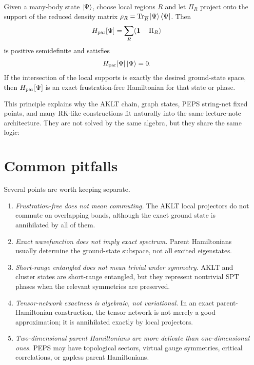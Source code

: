 \begin{principle}
Given a many-body state \(\left|\Psi\right\rangle\), choose local regions \(R\) and let
\(\Pi_R\) project onto the support of the reduced density matrix
\(\rho_R=\operatorname{Tr}_{\overline R}\left|\Psi\right\rangle\left\langle \Psi\right|\).  Then
\begin{equation}
\label{eq:abstract-parent-hamiltonian}
    H_{\rm par}[\Psi]
    =
    \sum_R(\mathbf{1}-\Pi_R)
\end{equation}
is positive semidefinite and satisfies
\begin{equation}
\label{eq:abstract-parent-annihilation}
    H_{\rm par}[\Psi]\left|\Psi\right\rangle=0 .
\end{equation}
If the intersection of the local supports is exactly the desired ground-state
space, then \(H_{\rm par}[\Psi]\) is an exact frustration-free Hamiltonian for
that state or phase.
\end{principle}

This principle explains why the AKLT chain, graph states, PEPS string-net fixed
points, and many RK-like constructions fit naturally into the same lecture-note
architecture.  They are not solved by the same algebra, but they share the same
logic:

\section{Common pitfalls}
\label{sec:aklt-cluster-parent-pitfalls}

Several points are worth keeping separate.

\begin{enumerate}[label=(\roman*)]
    \item \emph{Frustration-free does not mean commuting.}  The AKLT local
    projectors do not commute on overlapping bonds, although the exact ground
    state is annihilated by all of them.
    \item \emph{Exact wavefunction does not imply exact spectrum.}  Parent
    Hamiltonians usually determine the ground-state subspace, not all excited
    eigenstates.
    \item \emph{Short-range entangled does not mean trivial under symmetry.}
    AKLT and cluster states are short-range entangled, but they represent
    nontrivial SPT phases when the relevant symmetries are preserved.
    \item \emph{Tensor-network exactness is algebraic, not variational.}  In an
    exact parent-Hamiltonian construction, the tensor network is not merely a
    good approximation; it is annihilated exactly by local projectors.
    \item \emph{Two-dimensional parent Hamiltonians are more delicate than
    one-dimensional ones.}  PEPS may have topological sectors, virtual gauge
    symmetries, critical correlations, or gapless parent Hamiltonians.
\end{enumerate}

